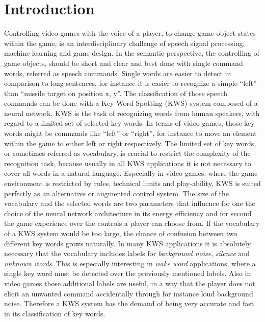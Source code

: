 
\chapter{Introduction}\label{sec:intro}
\thesisStateReady
Controlling video games with the voice of a player, to change game object states within the game, is an interdisciplinary challenge of speech signal processing, machine learning and game design.
In the semantic perspective, the controlling of game objects, should be short and clear and best done with single command words, referred as speech commands.
Single words are easier to detect in comparison to long sentences, for instance it is easier to recognize a simple \enquote{left} than \enquote{missile target on position x, y}.
The classification of those speech commands can be done with a Key Word Spotting (KWS) system composed of a neural network.
KWS is the task of recognizing words from human speakers, with regard to a limited set of selected key words.
In terms of video games, those key words might be commands like \enquote{left} or \enquote{right}, for instance to move an element within the game to either left or right respectively.
The limited set of key words, or sometimes referred as vocabulary, is crucial to restrict the complexity of the recognition task, because usually in all KWS applications it is not necessary to cover all words in a natural language.
Especially in video games, where the game environment is restricted by rules, technical limits and play-ability, KWS is suited perfectly as an alternative or augmented control system.
The size of the vocabulary and the selected words are two parameters that influence for one the choice of the neural network architecture in its energy efficiency and for second the game experience over the controls a player can choose from.
If the vocabulary of a KWS system would be too large, the chance of confusion between two different key words grows naturally.
In many KWS applications it is absolutely necessary that the vocabulary includes labels for \emph{background noise}, \emph{silence} and \emph{unknown words}. 
This is especially interesting in \emph{wake word} applications, where a single key word must be detected over the previously mentioned labels.
Also in video games those additional labels are useful, in a way that the player does not elicit an unwanted command accidentally through for instance loud background noise.
Therefore a KWS system has the demand of being very accurate and fast in its classification of key words.

